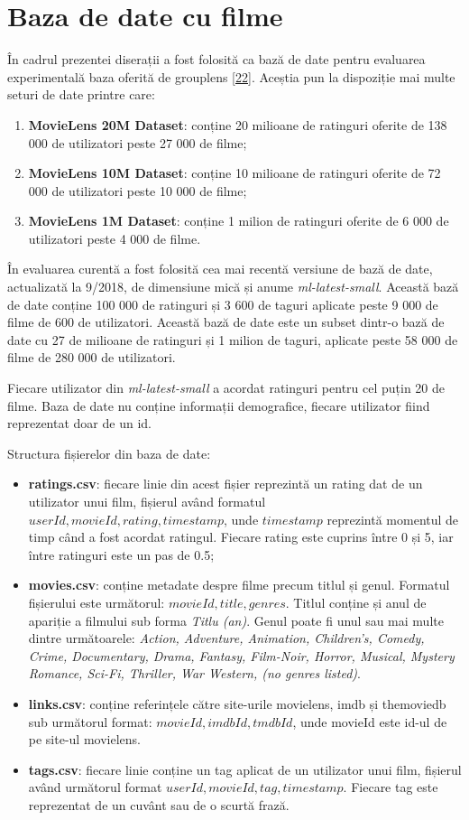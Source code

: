 \section{Baza de date cu filme}
În cadrul prezentei diserații a fost folosită ca bază de date pentru evaluarea experimentală baza oferită de grouplens \hyperlink{movielens}{[22]}. Aceștia pun la dispoziție mai multe seturi de date printre care:
\begin{enumerate}
	\item \textbf{MovieLens 20M Dataset}: conține 20 milioane de ratinguri oferite de 138 000 de utilizatori peste 27 000 de filme;
	\item \textbf{MovieLens 10M Dataset}: conține 10 milioane de ratinguri oferite de 72 000 de utilizatori peste 10 000 de filme;
	\item \textbf{MovieLens 1M Dataset}: conține 1 milion de ratinguri oferite de 6 000 de utilizatori peste 4 000 de filme.
\end{enumerate}

În evaluarea curentă a fost folosită cea mai recentă versiune de bază de date, actualizată la 9/2018, de dimensiune mică și anume \textit{ml-latest-small}. Această bază de date conține 100 000 de ratinguri și 3 600 de taguri aplicate peste 9 000 de filme de 600 de utilizatori. Această bază de date este un subset dintr-o bază de date cu 27 de milioane de ratinguri și 1 milion de taguri, aplicate peste 58 000 de filme de 280 000 de utilizatori.

Fiecare utilizator din \textit{ml-latest-small} a acordat ratinguri pentru cel puțin 20 de filme. Baza de date nu conține informații demografice, fiecare utilizator fiind reprezentat doar de un id.

Structura fișierelor din baza de date:
\begin{itemize}
	\item \textbf{ratings.csv}: fiecare linie din acest fișier reprezintă un rating dat de un utilizator unui film, fișierul având formatul $userId, movieId, rating, timestamp$, unde $timestamp$ reprezintă momentul de timp când a fost acordat ratingul. Fiecare rating este cuprins între 0 și 5, iar între ratinguri este un pas de 0.5;
	\item \textbf{movies.csv}: conține metadate despre filme precum titlul și genul. Formatul fișierului este următorul: $movieId, title, genres$. Titlul conține și anul de apariție a filmului sub forma \textit{Titlu (an)}. Genul poate fi unul sau mai multe dintre următoarele: \textit{Action, Adventure, Animation, Children's, Comedy, Crime, Documentary, Drama, Fantasy, Film-Noir, Horror, Musical, Mystery Romance, Sci-Fi, Thriller, War Western, (no genres listed)}.
	\item \textbf{links.csv}: conține referințele către site-urile movielens, imdb și themoviedb sub următorul format: $movieId,imdbId,tmdbId$, unde movieId este id-ul de pe site-ul movielens.
	\item \textbf{tags.csv}: fiecare linie conține un tag aplicat de un utilizator unui film, fișierul având următorul format $userId,movieId,tag,timestamp$. Fiecare tag este reprezentat de un cuvânt sau de o scurtă frază.
\end{itemize}


